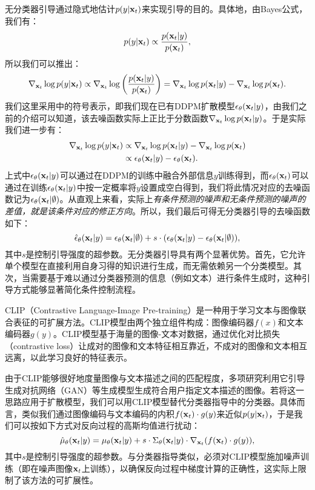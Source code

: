 \documentclass[11pt,a4paper,UTF8]{ctexart}
\begin{document}
无分类器引导\cite{ho2022classifier}通过隐式地估计$p(y|\mathbf{x}_t)$来实现引导的目的。具体地，由Bayes公式，我们有：
\begin{equation*}
    p(y|\mathbf{x}_t) \propto \frac{p(\mathbf{x}_t|y)}{p(\mathbf{x}_t)},
\end{equation*}
所以我们可以推出：
\begin{equation*}
    \nabla_{\mathbf{x}_t}\log p(y|\mathbf{x}_t) \propto \nabla_{\mathbf{x}_t}\log \left(\frac{p(\mathbf{x}_t|y)}{p(\mathbf{x}_t)}\right) = \nabla_{\mathbf{x}_t}\log p(\mathbf{x}_t|y) -\nabla_{\mathbf{x}_t}\log p(\mathbf{x}_t).
\end{equation*}
我们这里采用\cite{ho2022classifier}中的符号表示，即我们现在已有DDPM扩散模型$\epsilon_\theta(\mathbf{x}_t|y)$，由我们之前的介绍可以知道，该去噪函数实际上正比于分数函数$\nabla_{\mathbf{x}_t}\log p(\mathbf{x}_t|y)$。于是实际我们进一步有：
\begin{align*}
    \nabla_{\mathbf{x}_t}\log p(y|\mathbf{x}_t) & \propto \nabla_{\mathbf{x}_t}\log p(\mathbf{x}_t|y) -\nabla_{\mathbf{x}_t}\log p(\mathbf{x}_t) \\
    &\propto \epsilon_\theta(\mathbf{x}_t|y) - \epsilon_\theta(\mathbf{x}_t).
\end{align*}
上式中$\epsilon_\theta(\mathbf{x}_t|y)$可以通过在DDPM的训练中融合外部信息$y$训练得到，而$\epsilon_\theta(\mathbf{x}_t)$可以通过在训练$\epsilon_\theta(\mathbf{x}_t|y)$中按一定概率将$y$设置成空白得到\cite{ho2022classifier}，我们将此情况对应的去噪函数记为$\epsilon_\theta(\mathbf{x}_t|\emptyset)$。从直观上来看，实际上\emph{有条件预测的噪声和无条件预测的噪声的差值，就是该条件对应的修正方向}。所以，我们最后可得无分类器引导的去噪函数如下：
\begin{equation}
    \hat{\epsilon}_\theta(\mathbf{x}_t|y) = \epsilon_\theta(\mathbf{x}_t|\emptyset) + s\cdot(\epsilon_\theta(\mathbf{x}_t|y) - \epsilon_\theta(\mathbf{x}_t|\emptyset)),
\label{conditional_classifier_free_guided}
\end{equation}
其中$s$是控制引导强度的超参数。无分类器引导具有两个显著优势。首先，它允许单个模型在直接利用自身习得的知识进行生成，而无需依赖另一个分类模型。其次，当需要基于难以通过分类器预测的信息（例如文本）进行条件生成时，这种引导方式能够显著简化条件控制流程。

CLIP（Contrastive Language-Image Pre-training）\cite{radford2021learning}是一种用于学习文本与图像联合表征的可扩展方法。CLIP模型由两个独立组件构成：图像编码器$f(x)$和文本编码器$g(y)$。CLIP模型基于海量的图像-文本对数据，通过优化对比损失（contrastive loss）\cite{oord2018representation}让成对的图像和文本特征相互靠近，不成对的图像和文本相互远离，以此学习良好的特征表示。

由于CLIP能够很好地度量图像与文本描述之间的匹配程度，多项研究\cite{clip-guide-1,Patashnik_2021_ICCV,gal2022StyleGAN}利用它引导生成对抗网络（GAN）等生成模型生成符合用户指定文本描述的图像。若将这一思路应用于扩散模型，我们可以用CLIP模型替代分类器指导中的分类器。具体而言，类似我们通过图像编码与文本编码的内积$f(\mathbf{x}_t)\cdot g(y)$来近似$p(y|\mathbf{x}_t)$，于是我们可以按如下方式对反向过程的高斯均值进行扰动：
\begin{equation}
\hat{\mu}_{\theta}(\mathbf{x}_t|y)=\mu_{\theta}(\mathbf{x}_t|y) + s\cdot\Sigma_\theta(\mathbf{x}_t|y)\cdot\nabla_{\mathbf{x}_t}(f(\mathbf{x}_t)\cdot g(y)),
\label{conditional_clip_guided}
\end{equation}
其中$s$是控制引导强度的超参数。与分类器指导类似，必须对CLIP模型施加噪声训练（即在噪声图像$\mathbf{x}_t$上训练），以确保反向过程中梯度计算的正确性，这实际上限制了该方法的可扩展性。
\end{document}
